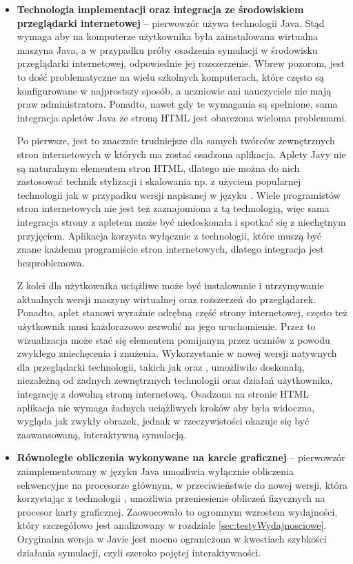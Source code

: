 \begin{itemize}

\item \textbf{Technologia implementacji oraz integracja ze środowiskiem
przeglądarki internetowej} -- pierwowzór używa technologii Java. Stąd wymaga aby
na komputerze użytkownika była zainstalowana wirtualna maszyna Java, a w
przypadku próby osadzenia symulacji w środowisku przeglądarki internetowej,
odpowiednie jej rozszerzenie. Wbrew pozorom, jest to dość problematyczne na
wielu szkolnych komputerach, które często są konfigurowane w najprostszy sposób,
a uczniowie ani nauczyciele nie mają praw administratora. Ponadto, nawet gdy te
wymagania są spełnione, sama integracja apletów Java ze stroną HTML jest
obarczona wieloma problemami.

Po pierwsze, jest to znacznie trudniejsze dla samych twórców zewnętrznych stron
internetowych w których ma zostać osadzona aplikacja. Aplety Javy nie są
naturalnym elementem stron HTML, dlatego nie można do nich zastosować technik
stylizacji i skalowania np. z użyciem popularnej technologii  jak w
przypadku wersji \en napisanej w języku \js. Wiele programistów stron
internetowych nie jest też zaznajomiona z tą technologią, więc sama integracja
strony z apletem może być niedoskonała i spotkać się z niechętnym przyjęciem.
Aplikacja \en \js korzysta wyłącznie z technologii, które muszą być znane
każdemu programiście stron internetowych, dlatego integracja jest bezproblemowa.

Z kolei dla użytkownika uciążliwe może być instalowanie i utrzymywanie
aktualnych wersji maszyny wirtualnej oraz rozszerzeń do przeglądarek. Ponadto,
aplet stanowi wyraźnie odrębną część strony internetowej, często też użytkownik
musi każdorazowo zezwolić na jego uruchomienie. Przez to wizualizacja może stać
się elementem pomijanym przez uczniów z powodu zwykłego zniechęcenia i znużenia.
Wykorzystanie w nowej wersji natywnych dla przeglądarki technologii, takich jak
\js oraz , umożliwiło doskonałą, niezależną od żadnych zewnętrznych
technologii oraz działań użytkownika, integrację z dowolną stroną internetową.
Osadzona na stronie HTML aplikacja nie wymaga żadnych uciążliwych kroków aby
była widoczna, wygląda jak zwykły obrazek, jednak w rzeczywistości okazuje się
być zaawansowaną, interaktywną symulacją.

\item \textbf{Równoległe obliczenia wykonywane na karcie graficznej} --
pierwowzór zaimplementowany w języku Java umożliwia wyłącznie obliczenia
sekwencyjne na procesorze głównym, w przeciwieństwie do nowej wersji, która
korzystając z technologii , umożliwia przeniesienie obliczeń
fizycznych na procesor karty graficznej. Zaowocowało to ogromnym wzrostem
wydajności, który szczegółowo jest analizowany w rozdziale
\ref{sec:testyWydajnosciowe}. Oryginalna wersja w Javie jest mocno ograniczona w
kwestiach szybkości działania symulacji, czyli szeroko pojętej interaktywności.


\end{itemize}
